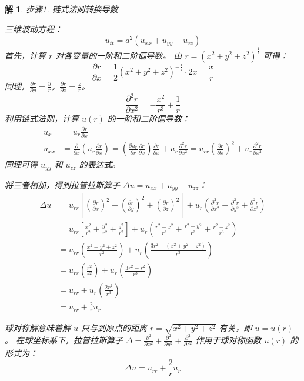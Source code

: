 \documentclass[12pt,a4paper]{article}
\newtheorem*{solution}{解}
\begin{document}
	\begin{solution}
	
步骤1. 链式法则转换导数
	
	\noindent
三维波动方程：
\[
u_{tt} = a^2(u_{xx} + u_{yy} + u_{zz})
\]
	首先，计算 $r$ 对各变量的一阶和二阶偏导数。
由 $r = (x^2+y^2+z^2)^{\frac{1}{2}}$ 可得：
\[
\frac{\partial r}{\partial x} = \frac{1}{2}(x^2+y^2+z^2)^{-\frac{1}{2}} \cdot 2x = \frac{x}{r}
\]
同理，$\frac{\partial r}{\partial y} = \frac{y}{r}$，$\frac{\partial r}{\partial z} = \frac{z}{r}$。
\[
\frac{\partial^2 r}{\partial x^2} = - \frac{x^2}{r^3} + \frac{1}{r}
\]
利用链式法则，计算 $u(r)$ 的一阶和二阶偏导数：
\begin{align*}
	u_x &= u_r \frac{\partial r}{\partial x} \\[6pt]
	u_{xx} &= \frac{\partial}{\partial x}\left(u_r \frac{\partial r}{\partial x}\right) = \left(\frac{\partial u_r}{\partial r}\frac{\partial r}{\partial x}\right)\frac{\partial r}{\partial x} + u_r \frac{\partial^2 r}{\partial x^2} = u_{rr}\left(\frac{\partial r}{\partial x}\right)^2 + u_r \frac{\partial^2 r}{\partial x^2}
\end{align*}
同理可得 $u_{yy}$ 和 $u_{zz}$ 的表达式。

将三者相加，得到拉普拉斯算子 $\Delta u = u_{xx} + u_{yy} + u_{zz}$：
\begin{align*}
	\Delta u &= u_{rr} \left[ \left(\frac{\partial r}{\partial x}\right)^2 + \left(\frac{\partial r}{\partial y}\right)^2 + \left(\frac{\partial r}{\partial z}\right)^2 \right] + u_r \left( \frac{\partial^2 r}{\partial x^2} + \frac{\partial^2 r}{\partial y^2} + \frac{\partial^2 r}{\partial z^2} \right) \\[6pt]
	&= u_{rr} \left[ \frac{x^2}{r^2} + \frac{y^2}{r^2} + \frac{z^2}{r^2} \right] + u_r \left( \frac{r^2-x^2}{r^3} + \frac{r^2-y^2}{r^3} + \frac{r^2-z^2}{r^3} \right) \\[6pt]
	&= u_{rr} \left( \frac{x^2+y^2+z^2}{r^2} \right) + u_r \left( \frac{3r^2 - (x^2+y^2+z^2)}{r^3} \right) \\[6pt]
	&= u_{rr} \left( \frac{r^2}{r^2} \right) + u_r \left( \frac{3r^2 - r^2}{r^3} \right) \\
	&= u_{rr} + u_r \left( \frac{2r^2}{r^3} \right) \\[6pt]
	&= u_{rr} + \frac{2}{r} u_r
\end{align*}



球对称解意味着解 $u$ 只与到原点的距离 $r = \sqrt{x^2+y^2+z^2}$ 有关，即 $u=u(r)$。
在球坐标系下，拉普拉斯算子 $\Delta = \frac{\partial^2}{\partial x^2} + \frac{\partial^2}{\partial y^2} + \frac{\partial^2}{\partial z^2}$ 作用于球对称函数 $u(r)$ 的形式为：
\[
\Delta u = u_{rr} + \frac{2}{r} u_r
\]


\end{solution}
\end{document}

